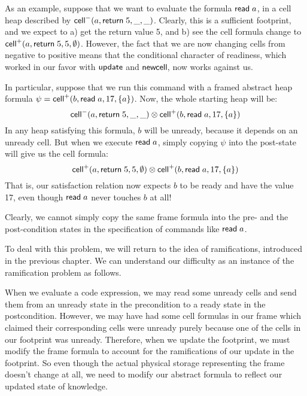 As an example, suppose that we want to evaluate the formula $\mathsf{read}\;
a$, in a cell heap described by $\mathsf{cell}^{-}({a}, {\mathsf{return}\; 5}, {\_}, {\_})$.  Clearly,
this is a sufficient footprint, and we expect to a) get the return
value 5, and b) see the cell formula change to $\mathsf{cell}^{+}({a}, {\mathsf{return}\;
  5}, {5}, {\emptyset})$.  However, the fact that we are now changing cells
from negative to positive means that the conditional character of
readiness, which worked in our favor with $\mathsf{update}$ and
$\mathsf{newcell}\;\!\!$, now works against us.

In particular, suppose that we run this command with a framed abstract heap
formula $\psi = \mathsf{cell}^{+}({b}, {\mathsf{read}\; a}, {17}, {\{{a}\}})$. Now, the
whole starting heap will be:
\begin{displaymath}
\mathsf{cell}^{-}({a}, {\mathsf{return}\; 5}, {\_}, {\_}) \otimes \mathsf{cell}^{+}({b}, {\mathsf{read}\; a}, {17}, {\{{a}\}})  
\end{displaymath}
In any heap satisfying this formula, $b$ will be unready, because it depends 
on an unready cell. But when we execute $\mathsf{read}\; a$, simply copying $\psi$ 
into the post-state will give us the cell formula:
\begin{displaymath}
\mathsf{cell}^{+}({a}, {\mathsf{return}\; 5}, {5}, {\emptyset}) \otimes \mathsf{cell}^{+}({b}, {\mathsf{read}\; a}, {17}, {\{{a}\}})
\end{displaymath}
That is, our satisfaction relation now expects $b$ to be ready and have the 
value 17, even though $\mathsf{read}\; a$ never touches $b$ at all!

Clearly, we cannot simply copy the same frame formula into the pre-
and the post-condition states in the specification of commands like
$\mathsf{read}\; a$.

To deal with this problem, we will return to the idea of
ramifications, introduced in the previous chapter. We can understand
our difficulty as an instance of the ramification problem as
follows. 

When we evaluate a code expression, we may read some unready cells and
send them from an unready state in the precondition to a ready state
in the postcondition. However, we may have had some cell formulas in
our frame which claimed their corresponding cells were unready purely
because one of the cells in our footprint was unready. Therefore, when
we update the footprint, we must modify the frame formula to account
for the ramifications of our update in the footprint. So even though
the actual physical storage representing the frame doesn't change at
all, we need to modify our abstract formula to reflect our updated
state of knowledge.

